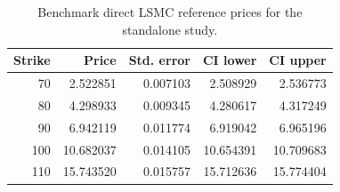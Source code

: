 \begin{table}[htbp]
\centering
\caption{Benchmark direct LSMC reference prices for the standalone study.}
\label{tab:bgk_r02_calibrated_t1_nex12-benchmark-references}
\begin{tabular}{rrrrr}
\toprule
Strike & Price & Std. error & CI lower & CI upper \\
\midrule
70 & 2.522851 & 0.007103 & 2.508929 & 2.536773 \\
80 & 4.298933 & 0.009345 & 4.280617 & 4.317249 \\
90 & 6.942119 & 0.011774 & 6.919042 & 6.965196 \\
100 & 10.682037 & 0.014105 & 10.654391 & 10.709683 \\
110 & 15.743520 & 0.015757 & 15.712636 & 15.774404 \\
\bottomrule
\end{tabular}
\end{table}

